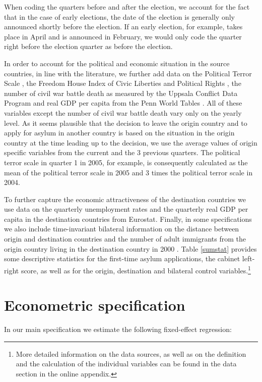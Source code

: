 \documentclass[a4paper,12pt]{article}
\begin{document}
 

When coding the quarters before and after the election, we account for the fact that in the case of early elections, the date of the election is generally only announced shortly before the election. If an early election, for example, takes place in April and is announced in February, we would only code the quarter right before the election quarter as before the election. 

In order to account for the political and economic situation in the source countries, in line with the literature, we further add data on the Political Terror Scale \citep{PTS2016} , the Freedom House Index of Civic Liberties and Political Rights \citep{FHI2017}, the number of civil war battle death as measured by the Uppsala Conflict Data Program \citep{Uppsala2017} and real GDP per capita from the Penn World Tables \citep{PWT2015}.  All of these variables except the number of civil war battle death vary only on the yearly level. As it seems plausible that  the decision to leave the origin country and to apply for asylum in another country is based on the situation in the origin country at the time leading up to the decision, we use the average values of origin specific variables from the current and the 3 previous quarters. The political terror scale in quarter 1 in 2005, for example, is consequently calculated as the mean of the political terror scale in 2005 and 3 times the political terror scale in 2004. 

To further capture the economic attractiveness of the destination countries we use data on the quarterly unemployment rates and the quarterly real GDP per capita in the destination countries from Eurostat. Finally, in some specifications we also include time-invariant bilateral information on the distance between origin and destination countries \citep{distance2017} and the number of adult immigrants from the origin country living in the destination country in 2000 \citep{Artucc2015}. Table \ref{sumstat} provides some descriptive statistics for the first-time asylum applications, the cabinet left-right score, as well as for the origin, destination and bilateral control variables.\footnote{More detailed information on the data sources, as well as on the definition and the calculation of the individual variables can be found in the data section in the online appendix.}





\section{Econometric specification} \label{sec:econometric}
In our main specification we estimate the following fixed-effect regression:
\end{document}
